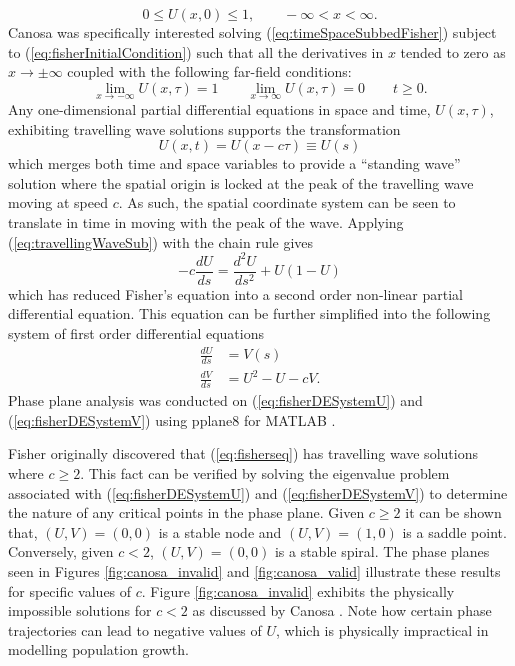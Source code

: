 \documentclass[11pt,a4paper]{article}
\begin{document}
		\begin{equation}
			 \label{eq:fisherInitialCondition}
			 0 \le U(x, 0) \le 1, \qquad -\infty < x < \infty.
		\end{equation}
		Canosa \cite{canosa1973nonlinear} was specifically interested solving (\ref{eq:timeSpaceSubbedFisher}) subject to (\ref{eq:fisherInitialCondition}) such that all the derivatives in $x$ tended to zero as $x \to \pm \infty$ coupled with the following far-field conditions:
		\begin{equation}
			 \label{eq:fisherBoundaryCondition}
			 \lim_{x\to -\infty} U(x,\tau) = 1 \qquad \lim_{x\to \infty} U(x,\tau) = 0 \qquad t \ge 0.
		\end{equation}
		Any one-dimensional partial differential equations in space and time, $U(x,\tau)$, exhibiting travelling wave solutions supports the transformation
		\begin{equation}
			 \label{eq:travellingWaveSub}
			 U(x,t) = U(x - c\tau) \equiv U(s)
		\end{equation}
		which merges both time and space variables to provide a ``standing wave'' solution where the spatial origin is locked at the peak of the travelling wave moving at speed $c$. As such, the spatial coordinate system can be seen to translate in time in moving with the peak of the wave. Applying (\ref{eq:travellingWaveSub}) with the chain rule gives
		\begin{equation*}
			 -c \frac{d U}{d s} = \frac{d^2 U}{d s^2} + U(1 - U)
		\end{equation*}
		which has reduced Fisher's equation into a second order non-linear partial differential equation. This equation can be further simplified into the following system of first order differential equations
		\begin{align}
			 \label{eq:fisherDESystemU}
			 \frac{d U}{d s} &= V(s) \\
			 \label{eq:fisherDESystemV}
			 \frac{d V}{d s} &= U^2 - U - cV.
		\end{align}
		Phase plane analysis was conducted on (\ref{eq:fisherDESystemU}) and (\ref{eq:fisherDESystemV}) using pplane8 for MATLAB \cite{pplane8}. 
		
		Fisher originally discovered that (\ref{eq:fisherseq}) has travelling wave solutions where $c \ge 2$. This fact can be verified by solving the eigenvalue problem associated with (\ref{eq:fisherDESystemU}) and (\ref{eq:fisherDESystemV}) to determine the nature of any critical points in the phase plane. Given $c \ge 2$ it can be shown that, $(U, V) = (0, 0)$ is a stable node and $(U, V) = (1, 0)$ is a saddle point. Conversely, given $c < 2$, $(U, V) = (0, 0)$ is a stable spiral. The phase planes seen in Figures \ref{fig:canosa_invalid} and \ref{fig:canosa_valid} illustrate these results for specific values of $c$. Figure \ref{fig:canosa_invalid} exhibits the physically impossible solutions for $c < 2$ as discussed by Canosa \cite{canosa1973nonlinear}. Note how certain phase trajectories can lead to negative values of $U$, which is physically impractical in modelling population growth.
\end{document}
